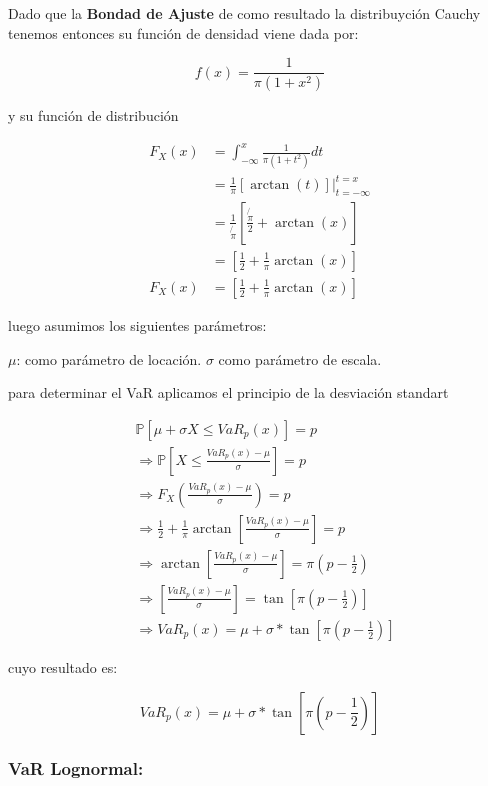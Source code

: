 \documentclass[]{article}
\begin{document}
Dado que la \textbf{Bondad de Ajuste} de como resultado la distribuyción
Cauchy tenemos entonces su función de densidad viene dada por:

\[f(x)= \frac{1}{\pi(1+x^2)}\]

y su función de distribución

\[\begin{array}{rl}
F_{X}(x) &=\int_{-\infty}^{x} \frac{1}{\pi(1+t^2)}dt\\
&\displaystyle =\frac{1}{\pi} \left[ \arctan(t) \right] \big |_{t=-\infty}^{t=x}\\
&\displaystyle =\frac{1}{\not{\pi}} \left[ \frac{\not{\pi}}{2}+ \arctan(x)\right]\\
&\displaystyle =\left[ \frac{1}{2} + \frac{1}{\pi}\arctan(x)\right]\\
F_{X}(x) &=\left[ \frac{1}{2} + \frac{1}{\pi}\arctan(x)\right]
\end{array}\]

luego asumimos los siguientes parámetros:

\(\mu\): como parámetro de locación. \(\sigma\) como parámetro de
escala.

para determinar el VaR aplicamos el principio de la desviación standart

\[\begin{array}{rl}  
&\displaystyle  \mathbb{P}[\mu + \sigma X \leq VaR_{p}(x)] = p\\
&\displaystyle  \Rightarrow \mathbb{P}[X \leq \frac{VaR_{p}(x)- \mu}{\sigma}] = p\\
&\displaystyle  \Rightarrow F_{X}(\frac{VaR_{p}(x)- \mu}{\sigma}) = p\\
&\displaystyle  \Rightarrow \frac{1}{2} + \frac{1}{\pi}\arctan\left[\frac{VaR_{p}(x) - \mu}{\sigma}\right] = p\\
&\displaystyle  \Rightarrow \arctan\left[\frac{VaR_{p}(x) - \mu}{\sigma}\right] = \pi(p-\frac{1}{2})\\
&\displaystyle  \Rightarrow \left[\frac{VaR_{p}(x) - \mu}{\sigma}\right] = \tan\left[\pi(p-\frac{1}{2})\right]\\
&\displaystyle  \Rightarrow VaR_p(x)=\mu+\sigma*\tan\left[\pi\left(p-\frac{1}{2}\right)\right]
\end{array}\]

cuyo resultado es:

\[VaR_p(x)=\mu+\sigma*\tan\left[\pi\left(p-\frac{1}{2}\right)\right]\]

\hypertarget{var-lognormal}{%
\subsubsection{\texorpdfstring{\textbf{VaR
Lognormal:}}{VaR Lognormal:}}\label{var-lognormal}}
\end{document}
